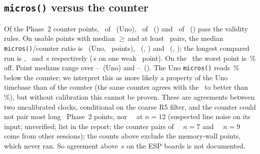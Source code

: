 \subsection{\texttt{micros()} versus the counter}\label{sec:res-counter}
Of the Phase~2 counter points, \UsableNUno\ of \RecordedNUno\ (Uno), \UsableNEspLo\ of \RecordedNEspLo\ (\espA) and \UsableNEspHi\ of \RecordedNEspHi\ (\espB) pass the validity rules. On usable points with median $\ge$\,\ModelFloorUs\us and at least \WeakMin\ pairs, the median \texttt{micros()}/counter ratio is \RatioMedUno\ (Uno, \RatioNUno\ points), \RatioMedEspLo\ (\espA, \RatioNEspLo) and \RatioMedEspHi\ (\espB, \RatioNEspHi); the longest compared run is \RatioLongSUno, \RatioLongSEspLo\ and \RatioLongSEspHi\,s respectively (\EspHiLongest\,s on one weak \espB\ point). On the \espB\ the worst point is \EspHiWorstPct\,\% off. Point medians range over \RatioMinUno--\RatioMaxUno\ (Uno) and \RatioMinEspLo--\RatioMaxEspLo\ (\espA). The Uno \texttt{micros()} reads \UnoBelowPct\,\% below the counter; we interpret this as more likely a property of the Uno timebase than of the counter (the same counter agrees with the \espB\ to better than \EspHiWorstPct\,\%), but without calibration this cannot be proven. These are agreements between two uncalibrated clocks, conditional on the coarse R5 filter, and the counter could not pair most long \espA\ Phase~2 points, nor \espB\ \grover\ at $n=12$ (suspected line noise on its input; unverified; list in the report; the counter pairs of \espA\ \grover\ $n=7$ and \espB\ \grover\ $n=9$ come from other sessions); the counts above exclude the memory-wall points, which never ran. So agreement above \RatioLongSEspLo\,s on the ESP boards is not documented.

